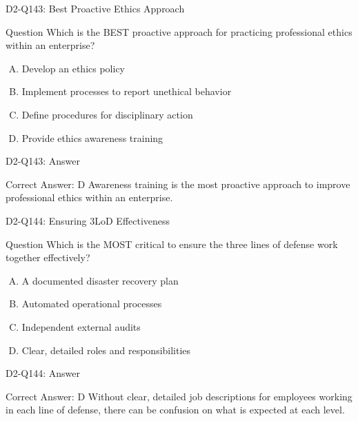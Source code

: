 \documentclass{beamer}
\begin{document}
	\begin{frame}{D2-Q143: Best Proactive Ethics Approach}
		\begin{block}{Question}
			Which is the BEST proactive approach for practicing professional ethics within an enterprise?
		\end{block}
		\begin{enumerate}[(A)]
			\item Develop an ethics policy
			\item Implement processes to report unethical behavior
			\item Define procedures for disciplinary action
			\item Provide ethics awareness training
		\end{enumerate}
	\end{frame}
	\begin{frame}{D2-Q143: Answer}
		\begin{block}{Correct Answer: D}
			Awareness training is the most proactive approach to improve professional ethics within an enterprise.
		\end{block}
	\end{frame}
	
	\begin{frame}{D2-Q144: Ensuring 3LoD Effectiveness}
		\begin{block}{Question}
			Which is the MOST critical to ensure the three lines of defense work together effectively?
		\end{block}
		\begin{enumerate}[(A)]
			\item A documented disaster recovery plan
			\item Automated operational processes
			\item Independent external audits
			\item Clear, detailed roles and responsibilities
		\end{enumerate}
	\end{frame}
	\begin{frame}{D2-Q144: Answer}
		\begin{block}{Correct Answer: D}
			Without clear, detailed job descriptions for employees working in each line of defense, there can be confusion on what is expected at each level.
		\end{block}
	\end{frame}
	
\end{document}
